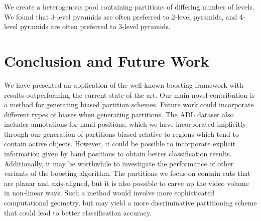 \documentclass[10pt,twocolumn,letterpaper]{article}
\begin{document}
	We create a heterogenous pool containing partitions of differing number of
	levels. We found that 3-level pyramids are often preferred to 2-level
	pyramids, and 4-level pyramids are often preferred to 3-level pyramids. 
	
\section{Conclusion and Future Work}
	We have presented an application of the well-known boosting framework
	with results outperforming the current state of the art. 
	Our main novel contribution is a method for generating biased partition
	schemes.
	Future work could incorporate different types of biases when generating
	partitions. The ADL dataset also includes annotations for hand positions,
	which we have incorporated implicitly through our generation of partitions
	biased relative to regions which tend to contain active objects. However,
	it could be possible to incorporate explicit information given by hand
	positions to obtain better classification results.
	Additionally, it may be worthwhile to investigate the performance of other
	variants of the boosting algorithm.
	The partitions we focus on contain cuts that are
  planar and axis-aligned, but it is also possible to carve up the
	video volume in non-linear ways. Such a method would involve more
	sophisticated computational geometry, but may yield a more discriminative
	partitioning scheme that could lead to better classification accuracy.
  

{\small


}
\end{document}
